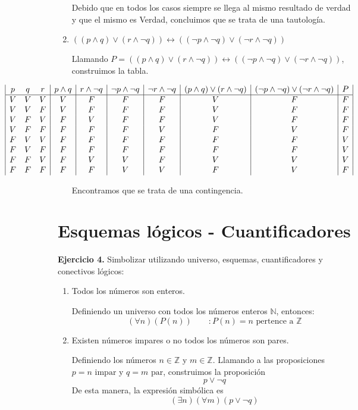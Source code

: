 \begin{enumerate}
	Debido que en todos los casos siempre se llega al mismo resultado de verdad y que el mismo es Verdad, concluimos que se trata de una tautolog\'ia.
	
	\item $((p \wedge q) \vee (r \wedge \neg q)) \leftrightarrow ((\neg p \wedge \neg q) \vee (\neg r \wedge \neg q))$
	
	Llamando $P = ((p \wedge q) \vee (r \wedge \neg q)) \leftrightarrow ((\neg p \wedge \neg q) \vee (\neg r \wedge \neg q))$, construimos la tabla.
	
	\begin{displaymath}
		\hspace*{-3cm}
		\begin{array}{|c c c|c|c|c|c|c|c|c|}
			p & q & r & p \wedge q & r \wedge \neg q & \neg p \wedge \neg q & \neg r \wedge \neg q & (p \wedge q) \vee (r \wedge \neg q) & (\neg p \wedge \neg q) \vee (\neg r \wedge \neg q) & P \\
			\hline 
			V & V & V & V & F & F & F & V & F & F\\
			V & V & F & V & F & F & F & V & F & F\\
			V & F & V & F & V & F & F & V & F & F\\
			V & F & F & F & F & F & V & F & V & F\\
			F & V & V & F & F & F & F & F & F & V\\
			F & V & F & F & F & F & F & F & F & V\\
			F & F & V & F & V & V & F & V & V & V\\
			F & F & F & F & F & V & V & F & V & F\\
		\end{array}
	\end{displaymath}

	Encontramos que se trata de una contingencia.
	
\end{enumerate}

\section{Esquemas l\'ogicos - Cuantificadores}

\textbf{Ejercicio 4.} Simbolizar utilizando universo, esquemas, cuantificadores y conectivos lógicos:

\begin{enumerate}
	\item Todos los números son enteros.
	
	Definiendo un universo con todos los n\'umeros enteros $\mathbb{N}$, entonces:
	\begin{equation*}
		(\forall n)(P(n))\qquad : P(n) = n \text{ pertence a } \mathbb{Z}
	\end{equation*}

	\item Existen números impares o no todos los números son pares.
	
	Definiendo los n\'umeros $n \in \mathbb{Z}$ y $m \in \mathbb{Z}$. Llamando a las proposiciones $p = n \text{ impar}$ y $q = m \text{ par}$, construimos la proposici\'on $$p \vee \neg q$$ De esta manera, la expresi\'on simb\'olica es $$(\exists n)(\forall m)(p \vee \neg q)$$
\end{enumerate}
